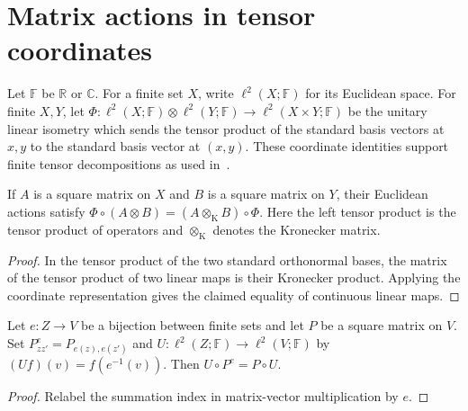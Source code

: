 \section{Matrix actions in tensor coordinates}

Let $\mathbb F$ be $\mathbb R$ or $\mathbb C$. For a finite set $X$, write
$\ell^2(X;\mathbb F)$ for its Euclidean space. For finite $X,Y$, let
$\Phi:\ell^2(X;\mathbb F)\otimes\ell^2(Y;\mathbb F)
    \longrightarrow\ell^2(X\times Y;\mathbb F)$ be the unitary linear isometry
which sends the tensor product of the standard basis vectors at $x,y$ to
the standard basis vector at $(x,y)$. These coordinate identities support
finite tensor decompositions as used
in~\cite[Proposition 5.7, lines 1311--1333]{Arad2016RigorousRG}.

\begin{theorem}
    \label{thm:euclidean_kronecker_intertwining}
    \leanok
    If $A$ is a square matrix on $X$ and $B$ is a square matrix on $Y$,
    their Euclidean actions satisfy
    $\Phi\circ(A\otimes B)=(A\otimes_{\mathrm K}B)\circ\Phi$.
    Here the left tensor product is the tensor product of operators and
    $\otimes_{\mathrm K}$ denotes the Kronecker matrix.
\end{theorem}

\begin{proof}\leanok
    In the tensor product of the two standard orthonormal bases, the
    matrix of the tensor product of two linear maps is their Kronecker
    product. Applying the coordinate representation gives the claimed
    equality of continuous linear maps.
\end{proof}

\begin{theorem}
    \label{thm:euclidean_submatrix_intertwining}
    \leanok
    Let $e:Z\longrightarrow V$ be a bijection between finite sets and let
    $P$ be a square matrix on $V$. Set $P^e_{zz'}=P_{e(z),e(z')}$ and
    $U:\ell^2(Z;\mathbb F)\longrightarrow\ell^2(V;\mathbb F)$ by
    $(Uf)(v)=f(e^{-1}(v))$. Then $U\circ P^e=P\circ U$.
\end{theorem}

\begin{proof}\leanok
    Relabel the summation index in matrix-vector multiplication by $e$.
\end{proof}


